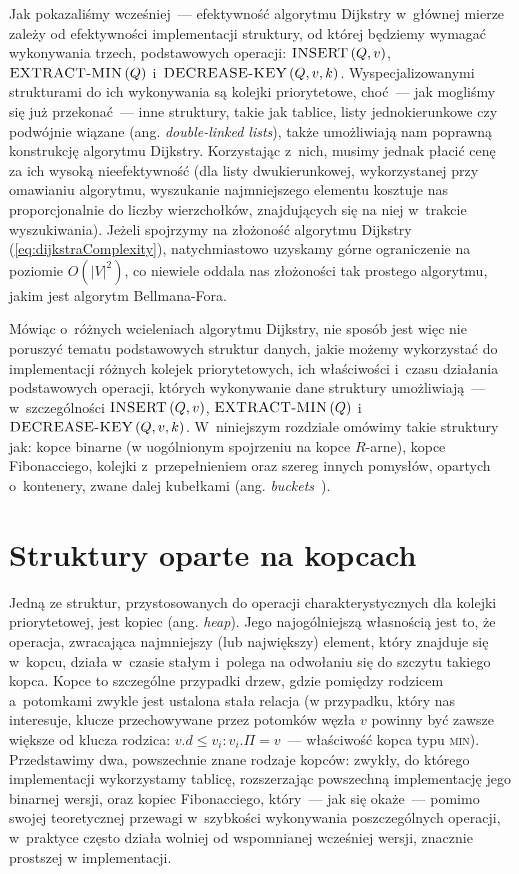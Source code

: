 Jak pokazaliśmy wcześniej~--- efektywność algorytmu Dijkstry w~głównej mierze zależy od efektywności implementacji struktury, od której będziemy wymagać wykonywania trzech, podstawowych operacji: $\textrm{\textsc{INSERT}} \left( Q, v \right)$, $\textrm{\textsc{EXTRACT-MIN}} \left( Q \right)$ i~$\textrm{\textsc{DECREASE-KEY}} \left( Q, v, k \right)$. Wyspecjalizowanymi strukturami do ich wykonywania są kolejki priorytetowe, choć~--- jak mogliśmy się już przekonać~--- inne struktury, takie jak tablice, listy jednokierunkowe czy podwójnie wiązane (ang. \textit{double-linked lists}), także umożliwiają nam poprawną konstrukcję algorytmu Dijkstry. Korzystając z~nich, musimy jednak płacić cenę za ich wysoką nieefektywność (dla listy dwukierunkowej, wykorzystanej przy omawianiu algorytmu, wyszukanie najmniejszego elementu kosztuje nas proporcjonalnie do liczby wierzchołków, znajdujących się na niej w~trakcie wyszukiwania). Jeżeli spojrzymy na złożoność algorytmu Dijkstry (\ref{eq:dijkstraComplexity}), natychmiastowo uzyskamy górne ograniczenie na poziomie $ O \left( \left| V \right| ^{2} \right)$, co niewiele oddala nas złożoności tak prostego algorytmu, jakim jest algorytm Bellmana-Fora.


Mówiąc o~różnych wcieleniach algorytmu Dijkstry, nie sposób jest więc nie poruszyć tematu podstawowych struktur danych, jakie możemy wykorzystać do implementacji różnych kolejek priorytetowych, ich właściwości i~czasu działania podstawowych operacji, których wykonywanie dane struktury umożliwiają~--- w~szczególności $\textrm{\textsc{INSERT}} \left( Q, v \right)$, $\textrm{\textsc{EXTRACT-MIN}} \left( Q \right)$ i~$\textrm{\textsc{DECREASE-KEY}} \left( Q, v, k \right)$. W~niniejszym rozdziale omówimy takie struktury jak: kopce binarne (w uogólnionym spojrzeniu na kopce $R$-arne), kopce Fibonacciego, kolejki z~przepełnieniem oraz szereg innych pomysłów, opartych o~kontenery, zwane dalej kubełkami (ang. \textit{buckets}~\cite[$4.6$,$4.8$]{Ahuja:1993:NFT:137406}).

\section{Struktury oparte na kopcach}

Jedną ze struktur, przystosowanych do operacji charakterystycznych dla kolejki priorytetowej, jest kopiec (ang. \textit{heap}). Jego najogólniejszą własnością jest to, że operacja, zwracająca najmniejszy (lub największy) element, który znajduje się w~kopcu, działa w~czasie stałym i~polega na odwołaniu się do szczytu takiego kopca. Kopce to szczególne przypadki drzew, gdzie pomiędzy rodzicem a~potomkami zwykle jest ustalona stała relacja (w przypadku, który nas interesuje, klucze przechowywane przez potomków węzła $v$ powinny być zawsze większe od klucza rodzica: $v.d \leqslant v_{i} : v_{i}.\Pi = v$~--- właściwość kopca typu \textsc{min}). Przedstawimy dwa, powszechnie znane rodzaje kopców: zwykły, do którego implementacji wykorzystamy tablicę, rozszerzając powszechną implementację jego binarnej wersji, oraz kopiec Fibonacciego, który~--- jak się okaże~--- pomimo swojej teoretycznej przewagi w~szybkości wykonywania poszczególnych operacji, w~praktyce często działa wolniej od wspomnianej wcześniej wersji, znacznie prostszej w implementacji.

